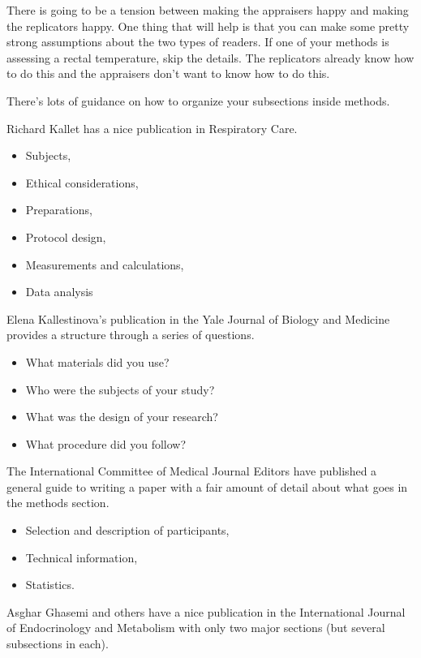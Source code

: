 \documentclass[
  letterpaper,
  DIV=11,
  numbers=noendperiod]{scrreprt}
\providecommand{\tightlist}{%
  \setlength{\itemsep}{0pt}\setlength{\parskip}{0pt}}\usepackage{longtable,booktabs,array}
\begin{document}
There is going to be a tension between making the appraisers happy and
making the replicators happy. One thing that will help is that you can
make some pretty strong assumptions about the two types of readers. If
one of your methods is assessing a rectal temperature, skip the details.
The replicators already know how to do this and the appraisers don't
want to know how to do this.

There's lots of guidance on how to organize your subsections inside
methods.

Richard Kallet has a nice publication in Respiratory Care.

\begin{itemize}
\tightlist
\item
  Subjects,
\item
  Ethical considerations,
\item
  Preparations,
\item
  Protocol design,
\item
  Measurements and calculations,
\item
  Data analysis
\end{itemize}

Elena Kallestinova's publication in the Yale Journal of Biology and
Medicine provides a structure through a series of questions.

\begin{itemize}
\tightlist
\item
  What materials did you use?
\item
  Who were the subjects of your study?
\item
  What was the design of your research?
\item
  What procedure did you follow?
\end{itemize}

The International Committee of Medical Journal Editors have published a
general guide to writing a paper with a fair amount of detail about what
goes in the methods section.

\begin{itemize}
\tightlist
\item
  Selection and description of participants,
\item
  Technical information,
\item
  Statistics.
\end{itemize}

Asghar Ghasemi and others have a nice publication in the International
Journal of Endocrinology and Metabolism with only two major sections
(but several subsections in each).
\end{document}
